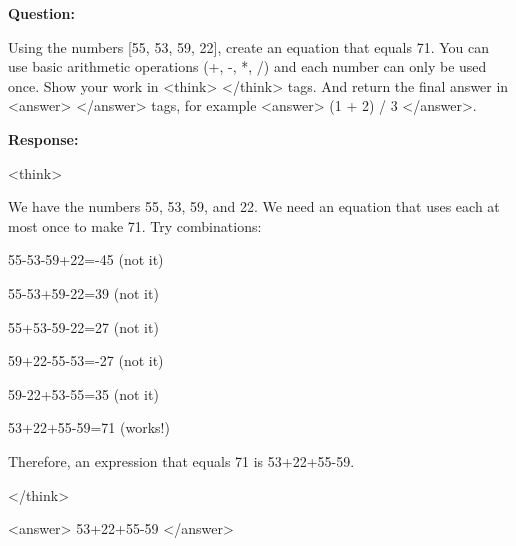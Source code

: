 \documentclass{article}
\theoremstyle{plain}
\theoremstyle{definition}
\theoremstyle{remark}
\begin{document}
\begin{tcolorbox}[
    colback=gray!5,
    colframe=gray!60,
    coltext=black,
    coltitle=white,
    title={Countdown},
    fonttitle=\small\bfseries,
    boxrule=0.4pt,
    arc=2mm,
    left=4pt, right=4pt, top=4pt, bottom=4pt
]

{\small\bfseries Question:}

{\ttfamily\small Using the numbers [55, 53, 59, 22], create an equation that equals 71. You can use basic arithmetic operations (+, -, *, /) and each number can only be used once. Show your work in <think> </think> tags. And return the final answer in <answer> </answer> tags, for example <answer> (1 + 2) / 3 </answer>.}

{\small\bfseries Response:}

{\ttfamily\small <think>}

{\ttfamily\small We have the numbers 55, 53, 59, and 22. We need an equation that uses each at most once to make 71. Try combinations:}

{\ttfamily\small 55-53-59+22=-45 (not it)}

{\ttfamily\small 55-53+59-22=39 (not it)}

{\ttfamily\small 55+53-59-22=27 (not it)}

{\ttfamily\small 59+22-55-53=-27 (not it)}

{\ttfamily\small 59-22+53-55=35 (not it)}

{\ttfamily\small 53+22+55-59=71 (works!)}

{\ttfamily\small Therefore, an expression that equals 71 is 53+22+55-59.}

{\ttfamily\small </think>}

{\ttfamily\small <answer> 53+22+55-59 </answer>}

\end{tcolorbox}
\end{document}
